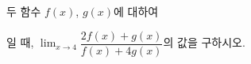 두 함수 $f(x)$, $g(x)$에 대하여\par\smallskip{}\par\smallskip\noindent 일 때, $\displaystyle\lim_{x\to 4}\dfrac{2f(x)+g(x)}{f(x)+4g(x)}$의 값을 구하시오.

